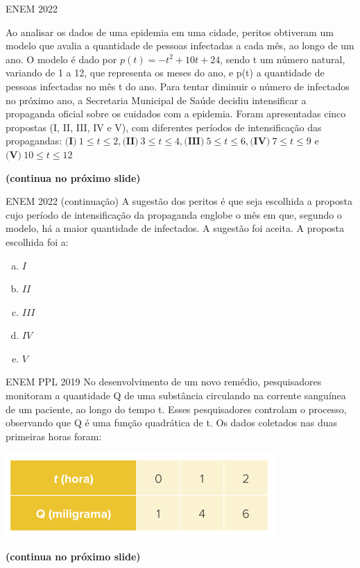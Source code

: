 \documentclass[11pt]{beamer}
\begin{document}
\begin{frame}{ENEM 2022}

    Ao analisar os dados de uma epidemia em uma cidade, peritos obtiveram um modelo que avalia a quantidade de pessoas infectadas a cada mês, ao longo de um ano. O modelo é dado por $p(t)=-t^{2}+10t+24$, sendo t um número natural, variando de 1 a 12, que representa os meses do ano, e p(t) a quantidade de pessoas infectadas no mês t do ano. Para tentar diminuir o número de infectados no próximo ano, a Secretaria Municipal de Saúde decidiu intensificar a propaganda oficial sobre os cuidados com a epidemia. Foram apresentadas cinco propostas (I, II, III, IV e V), com diferentes períodos de intensificação das propagandas: $\textbf{(I)}\ 1 \leq t \leq 2, \textbf{(II)}\ 3 \leq t \leq 4, \textbf{(III)}\ 5 \leq t \leq 6, \textbf{(IV)}\ 7 \leq t \leq 9$ e $\textbf{(V)}\ 10 \leq t \leq 12$

    \vfill
    \textbf{(continua no próximo slide)}
\end{frame}
\begin{frame}{ENEM 2022 (continuação)}
    A sugestão dos peritos é que seja escolhida a proposta cujo período de intensificação da propaganda englobe o mês em que, segundo o modelo, há a maior quantidade de infectados. A sugestão foi aceita. A proposta escolhida foi a:

    \begin{enumerate}[a)]
            \item $I$
            \item $II$
            \item $III$ %
            \item $IV$ 
            \item $V$
        \end{enumerate}
\end{frame}

\begin{frame}{ENEM PPL 2019}
    No desenvolvimento de um novo remédio, pesquisadores monitoram a quantidade Q de uma substância circulando na corrente sanguínea de um paciente, ao longo do tempo t. Esses pesquisadores controlam o processo, observando que Q é uma função quadrática de t. Os dados coletados nas duas primeiras horas foram:

    \begin{center}
        \includegraphics[scale=0.5]{imagens/enem-ppl-2019.png}
    \end{center} \textbf{(continua no próximo slide)}
\end{frame}
\end{document}
